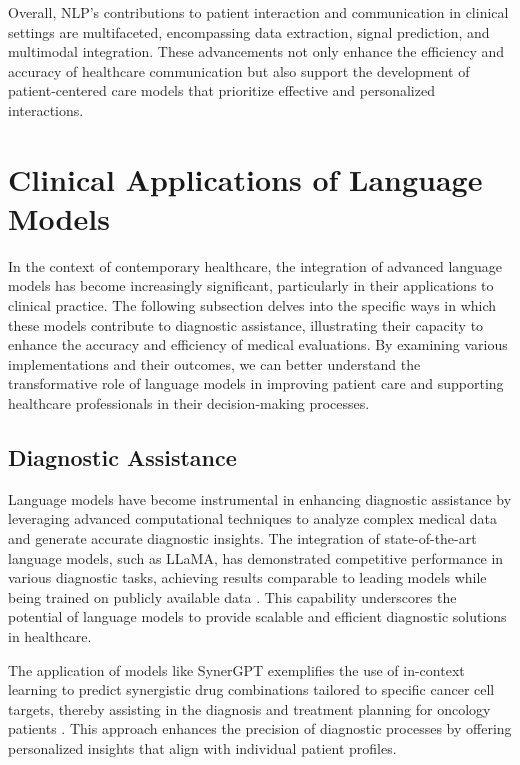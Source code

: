 Overall, NLP's contributions to patient interaction and communication in clinical settings are multifaceted, encompassing data extraction, signal prediction, and multimodal integration. These advancements not only enhance the efficiency and accuracy of healthcare communication but also support the development of patient-centered care models that prioritize effective and personalized interactions.








\section{Clinical Applications of Language Models} \label{sec:Clinical Applications of Language Models}

In the context of contemporary healthcare, the integration of advanced language models has become increasingly significant, particularly in their applications to clinical practice. The following subsection delves into the specific ways in which these models contribute to diagnostic assistance, illustrating their capacity to enhance the accuracy and efficiency of medical evaluations. By examining various implementations and their outcomes, we can better understand the transformative role of language models in improving patient care and supporting healthcare professionals in their decision-making processes.





\subsection{Diagnostic Assistance} \label{subsec:Diagnostic Assistance}



Language models have become instrumental in enhancing diagnostic assistance by leveraging advanced computational techniques to analyze complex medical data and generate accurate diagnostic insights. The integration of state-of-the-art language models, such as LLaMA, has demonstrated competitive performance in various diagnostic tasks, achieving results comparable to leading models while being trained on publicly available data \cite{touvron2023llama}. This capability underscores the potential of language models to provide scalable and efficient diagnostic solutions in healthcare.



The application of models like SynerGPT exemplifies the use of in-context learning to predict synergistic drug combinations tailored to specific cancer cell targets, thereby assisting in the diagnosis and treatment planning for oncology patients \cite{edwards2023synergptincontextlearningpersonalized}. This approach enhances the precision of diagnostic processes by offering personalized insights that align with individual patient profiles.



